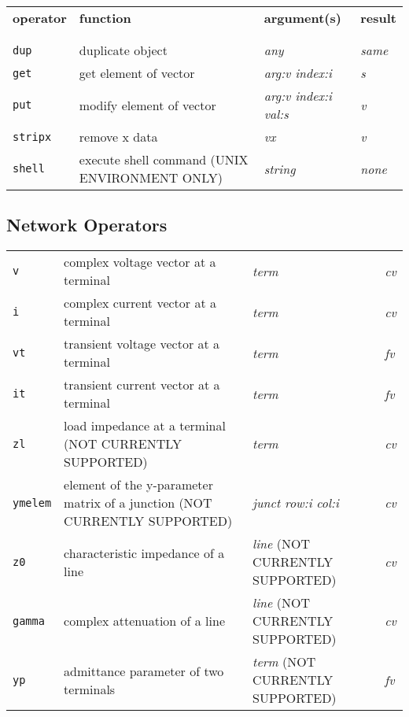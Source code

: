 \begin{tabular}{p{.8in}p{2.5in}p{1.0in}p{.75in}}
{\bf operator} & {\bf function} & {\bf argument(s)} & {\bf result} \\
\\
\\
{\tt dup} & duplicate object & {\it any} & {\it same} \\
{\tt get} & get element of vector & {\it arg:v \newline index:i} & {\it s} \\
{\tt put} & modify element of vector & {\it arg:v \newline index:i
\newline
  val:s} & {\it v} \\
{\tt stripx} & remove x data & {\it vx} & {\it v} \\
{\tt shell} & execute shell command (UNIX ENVIRONMENT ONLY)& {\it
string} & {\it none}
\end{tabular}

\subsection*{Network Operators}

\begin{tabular}{p{.8in}p{2.5in}p{1.0in}p{.75in}}
{\tt v} & complex voltage vector at a terminal & {\it term} & {\it cv} \\
{\tt i} & complex current vector at a terminal & {\it term} & {\it cv} \\
{\tt vt} & transient voltage vector at a terminal & {\it term} & {\it fv} \\
{\tt it} & transient current vector at a terminal & {\it term} & {\it fv} \\
{\tt zl} & load impedance at a terminal (NOT CURRENTLY SUPPORTED)& {\it term} & {\it cv} \\
{\tt ymelem} & element of the y-parameter matrix of a junction
(NOT CURRENTLY SUPPORTED)&
  {\it junct \newline row:i \newline col:i} & {\it cv} \\
{\tt z0} & characteristic impedance of a line & {\it line}  (NOT CURRENTLY SUPPORTED)& {\it cv} \\
{\tt gamma} & complex attenuation of a line & {\it line}  (NOT CURRENTLY SUPPORTED)& {\it cv} \\
{\tt yp} & admittance parameter of two terminals & {\it term} (NOT
CURRENTLY SUPPORTED)& {\it fv}
\end{tabular}
\newpage
